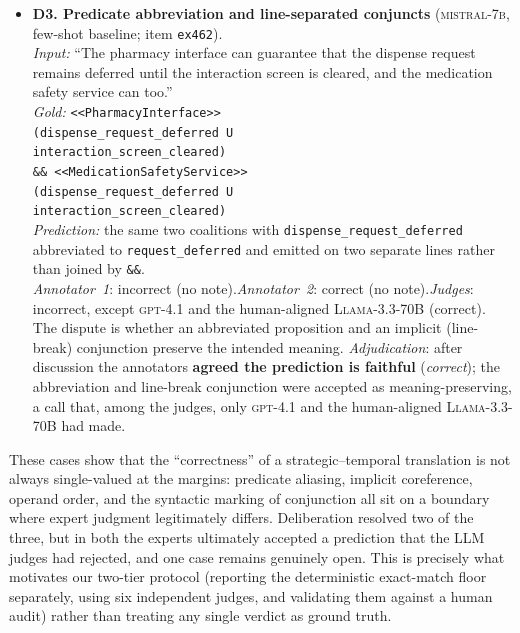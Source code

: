 \documentclass[letterpaper]{article}
\begin{document}
{\begin{itemize}[leftmargin=1.3em,itemsep=7pt]
  \emph{Annotator~1} (incorrect): ``scoping error: \texttt{U} operands are wrong.''\quad\emph{Annotator~2}: correct (no note).\quad\emph{All six judges}: incorrect.\\
  Every \texttt{U} has its two operands transposed (and one predicate altered), which annotator~1 read as inverting the temporal commitment; the dispute is how strictly operand order must be enforced. \emph{Adjudication}: after discussion the annotators \textbf{agreed the prediction is faithful} (\emph{correct}), overturning the stricter initial label and the six judges' unanimous incorrect verdict.
  \item \textbf{D3. Predicate abbreviation and line-separated conjuncts} (\textsc{mistral-7b}, few-shot baseline; item \texttt{ex462}).\\
  \emph{Input:} ``The pharmacy interface can guarantee that the dispense request remains deferred until the interaction screen is cleared, and the medication safety service can too.''\\
  \emph{Gold:} \texttt{<<PharmacyInterface>> \\(dispense\_request\_deferred U \\interaction\_screen\_cleared)}\\
  \texttt{\&\& <<MedicationSafetyService>> \\(dispense\_request\_deferred U\\ interaction\_screen\_cleared)}\\
  \emph{Prediction:} the same two coalitions with \texttt{dispense\_request\_deferred} abbreviated to \texttt{request\_deferred} and emitted on two separate lines rather than joined by \texttt{\&\&}.\\
  \emph{Annotator~1}: incorrect (no note).\quad\emph{Annotator~2}: correct (no note).\quad\emph{Judges}: incorrect, except \textsc{gpt-4.1} and the human-aligned \textsc{Llama-3.3-70B} (correct).\\
  The dispute is whether an abbreviated proposition and an implicit (line-break) conjunction preserve the intended meaning. \emph{Adjudication}: after discussion the annotators \textbf{agreed the prediction is faithful} (\emph{correct}); the abbreviation and line-break conjunction were accepted as meaning-preserving, a call that, among the judges, only \textsc{gpt-4.1} and the human-aligned \textsc{Llama-3.3-70B} had made.
\end{itemize}
}

\noindent These cases show that the ``correctness'' of a strategic--temporal translation is not always single-valued at the margins: predicate aliasing, implicit coreference, operand order, and the syntactic marking of conjunction all sit on a boundary where expert judgment legitimately differs. Deliberation resolved two of the three, but in both the experts ultimately accepted a prediction that the LLM judges had rejected, and one case remains genuinely open. This is precisely what motivates our two-tier protocol (reporting the deterministic exact-match floor separately, using six independent judges, and validating them against a human audit) rather than treating any single verdict as ground truth.
\end{document}
